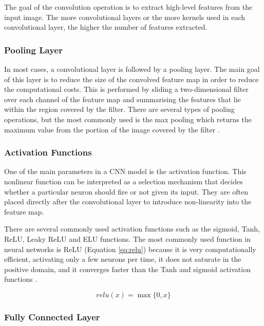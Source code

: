 The goal of the convolution operation is to extract high-level features from the input image. The more convolutional layers or the more kernels used in each convolutional layer, the higher the number of features extracted.



\subsubsection*{Pooling Layer}

In most cases, a convolutional layer is followed by a pooling layer. The main goal of this layer is to reduce the size of the convolved feature map in order to reduce the computational costs. This is performed by sliding a two-dimensional filter over each channel of the feature map and summarising the features that lie within the region covered by the filter. There are several types of pooling operations, but the most commonly used is the max pooling which returns the maximum value from the portion of the image covered by the filter \cite{2018guide}.

\subsubsection*{Activation Functions}

One of the main parameters in a \ac{CNN} model is the activation function. This nonlinear function can be interpreted as a selection mechanism that decides whether a particular neuron should fire or not given its input. They are often placed directly after the convolutional layer to introduce non-linearity into the feature map.

There are several commonly used activation functions such as the sigmoid, \ac{Tanh}, \ac{ReLU}, \ac{Leaky ReLU} and \ac{ELU} functions. The most commonly used function in neural networks is \ac{ReLU} (Equation \ref{eq:relu}) because it is very computationally efficient, activating only a few neurons per time, it does not saturate in the positive domain, and it converges faster than the \ac{Tanh} and sigmoid activation functions \cite{2018activation}.

\begin{equation}
    relu(x) = \max{\{0,x\}}
    \label{eq:relu}
\end{equation}

\subsubsection*{Fully Connected Layer}

